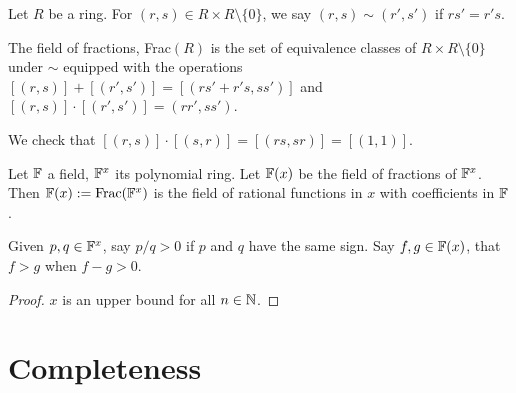 \documentclass{report}
\begin{document}


Let $R$ be a ring. For $(r, s) \in R \times R \setminus \{0\}$, we say $(r, s) \sim (r', s')$ if $rs' = r's$.

The field of fractions, Frac$(R)$ is the set of equivalence classes of $R \times R \setminus \{0\}$ under $\sim$ equipped with the operations $[(r, s)] + [(r', s')] = [(rs' + r's, ss')]$ and $[(r, s)] \cdot [(r', s')] = (rr', ss')$.

We check that $[(r , s)] \cdot [(s, r)] = [(rs, sr)] = [(1, 1)]$.

Let $\FF$ a field, $\FF[x]$ its polynomial ring. Let $\FF(x)$ be the field of fractions of $\FF[x]$. Then $\FF(x) := \text{Frac}(\FF[x])$ is the field of rational functions in $x$ with coefficients in $\FF$.

Given $p, q \in \FF[x]$, say $p/q > 0$ if $p$ and $q$ have the same sign. Say $f, g \in \FF(x)$, that $f > g$ when $f- g > 0$. 

\begin{proof}
    $x$ is an upper bound for all $n \in \NN$. 
\end{proof}




\section{Completeness}
\end{document}
